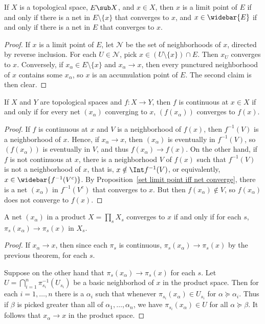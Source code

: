 \begin{proposition}\label{set limit point iff net converge}
If $X$ is a topological space, $E\sub X$, and $x\in X$, then $x$ is a limit point of $E$ if and only if there is a net in $E\setminus\{x\}$ that converges to $x$, and $x\in\widebar{E}$ if and only if there is a net in $E$ that converges to $x$.
\end{proposition}
\begin{proof}
If $x$ is a limit point of $E$, let $\mathcal{N}$ be the set of neighborhoods of $x$, directed by reverse inclusion. For each $U\in\mathcal{N}$, pick $x\in(U\setminus\{x\})\cap E$. Then $x_U$ converges to $x$. Conversely, if $x_\alpha\in E\setminus\{x\}$ and $x_\alpha\to x$, then every punctured neighborhood of $x$ contains some $x_\alpha$, so $x$ is an accumulation point of $E$. The second claim is then clear.
\end{proof}
\begin{proposition}\label{continuous iff net}
If $X$ and $Y$ are topological spaces and $f:X\to Y$, then $f$ is continuous at $x\in X$ if and only if for every net $(x_\alpha)$ converging to $x$, $(f(x_\alpha))$ converges to $f(x)$.
\end{proposition}
\begin{proof}
If $f$ is continuous at $x$ and $V$ is a neighborhood of $f(x)$, then $f^{-1}(V)$ is a neighborhood of $x$. Hence, if $x_\alpha\to x$, then $(x_\alpha)$ is eventually in $f^{-1}(V)$, so $(f(x_\alpha))$ is eventually in $V$, and thus $f(x_\alpha)\to f(x)$. On the other hand, if $f$ is not continuous at $x$, there is a neighborhood $V$ of $f(x)$ such that $f^{-1}(V)$ is not a neighborhood of $x$, that is, $x\notin\Int f^{-1}(V)$, or equivalently, $x\in\widebar{f^{-1}(V^c)}$. By Proposition~\ref{set limit point iff net converge}, there is a net $(x_\alpha)$ in $f^{-1}(V^c)$ that converges to $x$. But then $f(x_\alpha)\notin V$, so $f(x_\alpha)$ does not converge to $f(x)$.
\end{proof}
\begin{proposition}\label{net in product space converge iff}
A net $(x_\alpha)$ in a product $X=\prod_s X_s$ converges to $x$ if and only if for each $s$, $\pi_s(x_\alpha)\to\pi_s(x)$ in $X_s$.
\end{proposition}
\begin{proof}
If $x_\alpha\to x$, then since each $\pi_s$ is continuous, $\pi_s(x_\alpha)\to\pi_s(x)$ by the previous theorem, for each $s$.\par
Suppose on the other hand that $\pi_s(x_\alpha)\to\pi_s(x)$ for each $s$. Let $U=\bigcap_{i=1}^{n}\pi^{-1}_{s_i}(U_{s_i})$ be a basic neighborhod of $x$ in the product space. Then for each $i=1,\dots,n$ there is a $\alpha_i$ such that whenever $\pi_{s_i}(x_\alpha)\in U_{s_i}$ for $\alpha\succeq\alpha_i$. Thus if $\beta$ is picked greater than all of $\alpha_1,\dots,\alpha_n$, we have $\pi_{s_i}(x_\alpha)\in U$ for all $\alpha\succeq\beta$. It follows that $x_\alpha\to x$ in the product space.
\end{proof}
